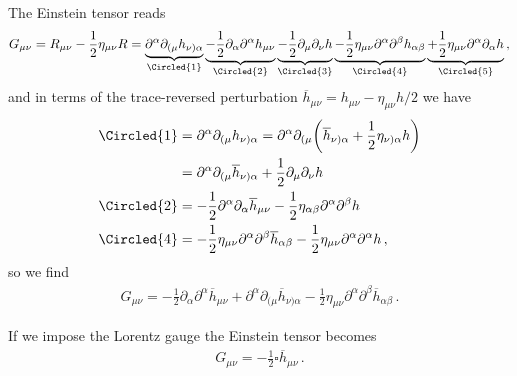 \documentclass[main.tex]{subfiles}
\begin{document}
The Einstein tensor reads 
%
\begin{align}
G_{\mu \nu } = R_{\mu \nu } - \frac{1}{2}  \eta_{\mu \nu } R 
= \underbrace{\partial^{\alpha } \partial_{(\mu } h_{\nu ) \alpha }}_{\Circled{1}}
\underbrace{- \frac{1}{2} \partial_{\alpha } \partial^{\alpha } h_{\mu \nu }}_{\Circled{2}}
\underbrace{- \frac{1}{2} \partial_{\mu } \partial_{\nu } h }_{\Circled{3}}
\underbrace{- \frac{1}{2} \eta_{\mu \nu } \partial^{\alpha } \partial^{\beta } h_{\alpha  \beta }}_{\Circled{4}}
\underbrace{+ \frac{1}{2} \eta_{\mu \nu } \partial^{\alpha } \partial_{\alpha } h }_{\Circled{5}}
\,,
\end{align}
%
and in terms of the trace-reversed perturbation \(\overline{h}_{\mu \nu } = h_{\mu \nu } - \eta_{\mu \nu } h / 2\) we have 
%
\begin{align}
\Circled{1} &= \partial^{\alpha } \partial_{(\mu } h_{\nu ) \alpha } 
= \partial^{\alpha } \partial_{(\mu } \qty(\overline{h}_{\nu ) \alpha } + \frac{1}{2} \eta_{\nu ) \alpha } h)  \\
&= \partial^{\alpha } \partial_{(\mu } \overline{h}_{\nu ) \alpha }
+ \frac{1}{2} \partial_{\mu } \partial_{\nu } h  \\
\Circled{2} &= 
- \frac{1}{2} \partial^{\alpha } \partial_{\alpha } \overline{h}_{\mu \nu } - \frac{1}{2} \eta_{\alpha \beta } \partial^{\alpha } \partial^{\beta } h  \\
\Circled{4} &= - \frac{1}{2} \eta_{\mu \nu } \partial^{\alpha } \partial^{\beta } \overline{h}_{\alpha \beta } 
- \frac{1}{2} \eta_{\mu \nu } \partial^{\alpha } \partial^{\alpha }
h
\,,
\end{align}
%
so we find  
%
\begin{align}
G_{\mu \nu } = - \frac{1}{2} \partial_{\alpha } \partial^{\alpha }
\overline{h}_{\mu \nu } + \partial^{\alpha } \partial_{(\mu } \overline{h}_{\nu ) \alpha } - \frac{1}{2 }\eta_{\mu \nu } \partial^{\alpha } \partial^{\beta } \overline{h}_{\alpha \beta }
\,.
\end{align}

If we impose the Lorentz gauge the Einstein tensor becomes 
%
\begin{align}
G_{\mu \nu } = - \frac{1}{2} \square \overline{h}_{\mu \nu }
\,.
\end{align}
\end{document}
